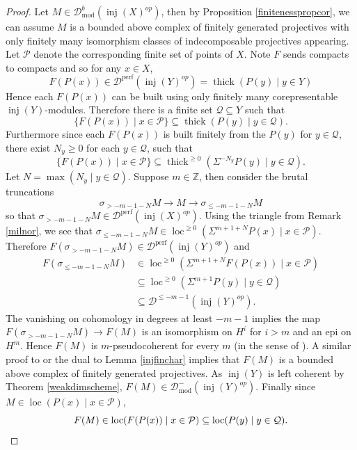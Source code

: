 \documentclass[12pt,oneside]{amsart}
\DeclareMathOperator{\loc}{loc}
\DeclareMathOperator{\thick}{thick}
\DeclareMathOperator{\fdmod}{mod}
\DeclareMathOperator{\perf}{perf}
\DeclareMathOperator{\inj}{inj}
\begin{document}
\begin{proof}
Let $M \in \mathcal{D}^b_{\fdmod}(\inj(X)^{op})$, then by Proposition \ref{finitenesspropcor}, we can assume $M$ is a bounded above complex of finitely generated projectives with only finitely many isomorphism classes of indecomposable projectives appearing. Let $\mathcal{P}$ denote the corresponding finite set of points of $X$. Note $F$ sends compacts to compacts and so for any $x \in X$, 
\[
F(P(x)) \in \mathcal{D}^{\perf}(\inj(Y)^{op}) = \thick(P(y) \mid y \in Y )
\]
Hence each $F(P(x))$ can be built using only finitely many corepresentable $\inj(Y)$-modules. Therefore there is a finite set $\mathcal{Q} \subseteq Y$ such that 
\[
\{ F(P(x)) \mid x \in \mathcal{P} \} \subseteq \thick(P(y) \mid y \in \mathcal{Q}).
\]
Furthermore since each $F(P(x))$ is built finitely from the $P(y)$ for $y \in \mathcal{Q}$, there exist $N_y \geq 0$ for each $y \in \mathcal{Q}$, such that 
\[
\{ F(P(x)) \mid x \in \mathcal{P} \} \subseteq \thick^{ \geq 0}(\Sigma^{-N_y} P(y) \mid y \in \mathcal{Q}).
\]
Let $N = \max(N_y \mid y \in \mathcal{Q})$. Suppose $m \in \mathbb{Z}$, then consider the brutal truncations
\[
\sigma_{> -m -1 -N} M \to M \to \sigma_{\leq -m -1 -N} M
\]
so that $\sigma_{> -m -1 -N} M \in \mathcal{D}^{\perf}(\inj(X)^{op})$. Using the triangle from Remark \ref{milnor}, we see that $\sigma_{\leq -m -1 -N} M \in \loc^{\geq 0}(\Sigma^{m+1+N} P(x) \mid x \in \mathcal{P})$. Therefore $F(\sigma_{> -m -1 -N} M) \in \mathcal{D}^{\perf}(\inj(Y)^{op})$ and 
\begin{align*}
F(\sigma_{\leq -m -1 -N} M) & \in \loc^{\geq 0}(\Sigma^{m+1+N} F(P(x)) \mid x \in \mathcal{P})  \\ 
& \subseteq \loc^{\geq 0}(\Sigma^{m+1} P(y) \mid y \in \mathcal{Q}) \\
& \subseteq \mathcal{D}^{\leq -m-1}(\inj(Y)^{op}).
\end{align*}
The vanishing on cohomology in degrees at least $-m-1$ implies the map $F(\sigma_{> -m-1-N} M) \to F(M)$ is an isomorphism on $H^i$ for $i > m$ and an epi on $H^m$. Hence $F(M)$ is $m$-pseudocoherent for every $m$ (in the sense of \cite[Tag 064N]{stacks-project}). A similar proof to \cite[Tag 0640]{stacks-project} or the dual to Lemma \ref{injfinchar} implies that $F(M)$ is a bounded above complex of finitely generated projectives. As $\inj(Y)$ is left coherent by Theorem \ref{weakdimscheme}, $F(M) \in \mathcal{D}^-_{\fdmod}(\inj(Y)^{op})$. Finally since $M \in \loc(P(x) \mid x \in \mathcal{P})$, 
\[
F(M) \in \loc(F(P(x)) \mid x \in \mathcal{P}) \subseteq \loc(P(y) \mid y \in \mathcal{Q}).\qedhere
\]
\end{proof}
\end{document}
